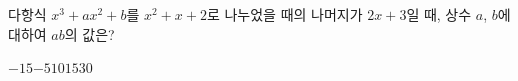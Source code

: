 다항식 $x^3+ax^2+b$를 $x^2+x+2$로 나누었을 때의 나머지가 $2x+3$일 때, 상수 $a$, $b$에 대하여 $ab$의 값은?
\begin{choices32}{$-15$}{$-5$}{$10$}{$15$}{$30$}\end{choices32}
